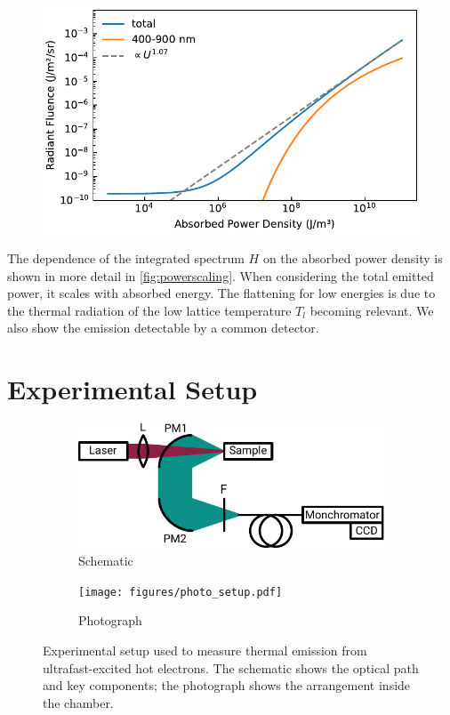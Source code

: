 \documentclass[
	parskip=half,
	a4paper,
]{scrarticle}
\begin{document}
\begin{figure}
    \centering
    \includegraphics{../analysis/figures/powerscaling.pdf}
    \caption{}
    \label{fig:powerscaling}
\end{figure}
The dependence of the integrated spectrum $H$ on the absorbed power density is shown in more detail in \autoref{fig:powerscaling}.
When considering the total emitted power, it scales with absorbed energy. The flattening for low energies is due to the thermal radiation of the low lattice temperature $T_l$ becoming relevant.
We also show the emission detectable by a common detector.

\clearpage
\section{Experimental Setup}
\begin{figure}[h]
    \centering
    \begin{subfigure}{3.5in}
        \centering
        \includegraphics{figures/setup.pdf}
        \caption{Schematic}
    \end{subfigure}\hfill
    \begin{subfigure}{2in}
        \centering
        \texttt{[image: figures/photo\_setup.pdf]}
        \caption{Photograph}
    \end{subfigure}
    \caption{Experimental setup used to measure thermal emission from ultrafast-excited hot electrons. The schematic shows the optical path and key components; the photograph shows the arrangement inside the chamber.}
    \label{fig:setup}
\end{figure}
\end{document}
